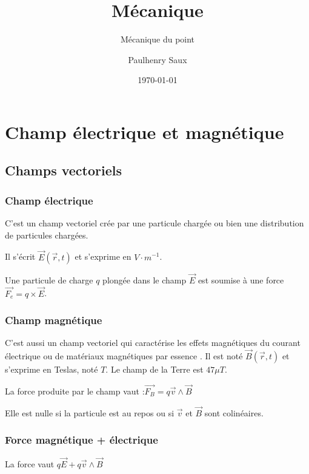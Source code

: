 \documentclass[french]{yLectureNote}
\title{Mécanique}
\subtitle{Mécanique du point}
\author{Paulhenry Saux}
\date{\today}
\renewcommand{\vec}{\overrightarrow}
\begin{document}
\setcounter{chapter}{4}
	\chapter{Champ électrique et magnétique }
\section{Champs vectoriels}

\subsection{Champ électrique}
C'est un champ vectoriel crée par une particule chargée ou bien une distribution de particules chargées.

Il s'écrit $\vec{E}(\vec{r},t)$ et s'exprime en $V\cdot m^{-1}$.
\begin{theorem}
Une particule de charge $q$ plongée dans le champ $\vec{E}$ est soumise à une force $\vec{F_e} = q\times\vec{E}$.
\end{theorem}


\subsection{Champ magnétique}
C'est aussi un champ vectoriel qui caractérise les effets magnétiques du courant électrique ou de matériaux magnétiques par essence . Il est noté $\vec{B}(\vec{r},t)$ et s'exprime en Teslas, noté $T$. Le champ de la Terre est $47\mu T$.
\begin{theorem}
La force produite par le champ vaut :$\vec{F_B} = q\vec{v} \wedge \vec{B}$
\end{theorem}
Elle est nulle si la particule est au repos ou si $\vec{v}$ et $\vec{B}$ sont colinéaires.
\subsection{Force magnétique + électrique}
\begin{theorem}
La force vaut $q\vec{E} + q\vec{v}\wedge \vec{B}$
\end{theorem}
\end{document}
